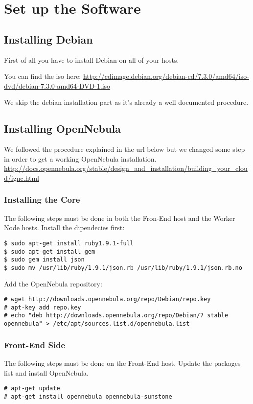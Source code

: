 \documentclass[11pt,a4paper]{article}
\begin{document}
\section{Set up the Software}


\subsection{Installing Debian}
First of all you have to install Debian on all of your hosts.

You can find the iso here: \url{http://cdimage.debian.org/debian-cd/7.3.0/amd64/iso-dvd/debian-7.3.0-amd64-DVD-1.iso}

We skip the debian installation part as it's already a well documented procedure.

\subsection{Installing OpenNebula}

We followed the procedure explained in the url below but we changed some step in order to get a working OpenNebula installation.\cite{OpenNebulaOfficial}
\url{http://docs.opennebula.org/stable/design_and_installation/building_your_cloud/ignc.html}

\subsubsection{Installing the Core}
The following steps must be done in both the Fron-End host and the Worker Node hosts.
Install the dipendecies first:
\begin{lstlisting}
$ sudo apt-get install ruby1.9.1-full
$ sudo apt-get install gem
$ sudo gem install json
$ sudo mv /usr/lib/ruby/1.9.1/json.rb /usr/lib/ruby/1.9.1/json.rb.no
\end{lstlisting}

Add the OpenNebula repository:
\begin{lstlisting}
# wget http://downloads.opennebula.org/repo/Debian/repo.key
# apt-key add repo.key
# echo "deb http://downloads.opennebula.org/repo/Debian/7 stable opennebula" > /etc/apt/sources.list.d/opennebula.list
\end{lstlisting}

\subsubsection{Front-End Side}
The following steps must be done on the Front-End host.
Update the packages list and install OpenNebula.
\begin{lstlisting}
# apt-get update
# apt-get install opennebula opennebula-sunstone
\end{lstlisting}
\end{document}
